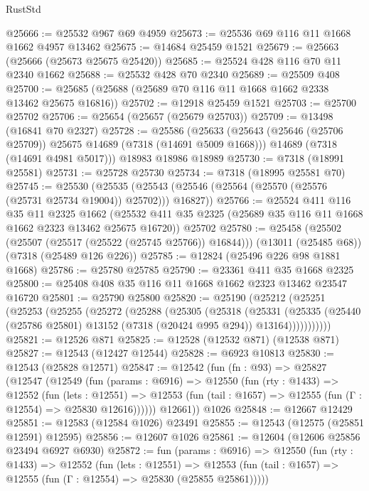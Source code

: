 \begin{lexlean}{RustStd}
\begin{coremodule}
@25666 := @25532 @967 @69 @4959
@25673 := @25536 @69 @116 @11 @1668 @1662 @4957 @13462
@25675 := @14684 @25459 @1521
@25679 := @25663 (@25666 (@25673 @25675 @25420))
@25685 := @25524 @428 @116 @70 @11 @2340 @1662
@25688 := @25532 @428 @70 @2340
@25689 := @25509 @408
@25700 := @25685 (@25688 (@25689 @70 @116 @11 @1668 @1662 @2338 @13462 @25675 @16816))
@25702 := @12918 @25459 @1521
@25703 := @25700 @25702
@25706 := @25654 (@25657 (@25679 @25703))
@25709 := @13498 (@16841 @70 @2327)
@25728 := @25586
    (@25633
      (@25643 (@25646 (@25706 @25709)) @25675 @14689 (@7318 (@14691 @5009 @1668)))
      @14689
      (@7318 (@14691 @4981 @5017)))
    @18983
    @18986
    @18989
@25730 := @7318 (@18991 @25581)
@25731 := @25728 @25730
@25734 := @7318 (@18995 @25581 @70)
@25745 := @25530
    (@25535 (@25543 (@25546 (@25564 (@25570 (@25576 (@25731 @25734 @19004)) @25702))) @16827))
@25766 := @25524
    @411
    @116
    @35
    @11
    @2325
    @1662
    (@25532 @411 @35 @2325 (@25689 @35 @116 @11 @1668 @1662 @2323 @13462 @25675 @16720))
    @25702
@25780 := @25458
    (@25502 (@25507 (@25517 (@25522 (@25745 @25766)) @16844)))
    (@13011 (@25485 @68))
    (@7318 (@25489 @126 @226))
@25785 := @12824 (@25496 @226 @98 @1881 @1668)
@25786 := @25780 @25785
@25790 := @23361 @411 @35 @1668 @2325
@25800 := @25408 @408 @35 @116 @11 @1668 @1662 @2323 @13462 @23547 @16720
@25801 := @25790 @25800
@25820 := @25190
    (@25212
      (@25251
        (@25253
          (@25255
            (@25272
              (@25288
                (@25305
                  (@25318
                    (@25331
                      (@25335
                        (@25440 (@25786 @25801) @13152 (@7318 (@20424 @995 @294)) @13164)))))))))))
@25821 := @12526 @871
@25825 := @12528 (@12532 @871) (@12538 @871)
@25827 := @12543 (@12427 @12544)
@25828 := @6923 @10813
@25830 := @12543 (@25828 @12571)
@25847 := @12542
    (fun (fn : @93) =>
    @25827
      (@12547
        (@12549
          (fun (params : @6916) =>
          @12550
            (fun (rty : @1433) =>
            @12552
              (fun (lets : @12551) =>
              @12553 (fun (tail : @1657) => @12555 (fun (Γ : @12554) => @25830 @12616))))))
        @12661))
    @1026
@25848 := @12667 @12429
@25851 := @12583 (@12584 @1026) @23491
@25855 := @12543 (@12575 (@25851 @12591) @12595)
@25856 := @12607 @1026
@25861 := @12604 (@12606 @25856 @23494 @6927 @6930)
@25872 := fun (params : @6916) =>
  @12550
    (fun (rty : @1433) =>
    @12552
      (fun (lets : @12551) =>
      @12553 (fun (tail : @1657) => @12555 (fun (Γ : @12554) => @25830 (@25855 @25861)))))

\end{coremodule}
\end{lexlean}

